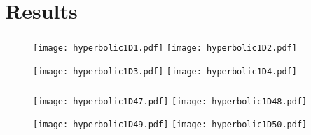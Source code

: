 \section{Results}

\begin{frame}
	\frametitle{\secname}
	\begin{figure}[H]
		\centering
		\texttt{[image: hyperbolic1D1.pdf]}
		\texttt{[image: hyperbolic1D2.pdf]}

		\texttt{[image: hyperbolic1D3.pdf]}
		\texttt{[image: hyperbolic1D4.pdf]}
	\end{figure}
\end{frame}

\begin{frame}
	\frametitle{\secname}
	\begin{figure}[H]
		\centering
		\texttt{[image: hyperbolic1D47.pdf]}
		\texttt{[image: hyperbolic1D48.pdf]}

		\texttt{[image: hyperbolic1D49.pdf]}
		\texttt{[image: hyperbolic1D50.pdf]}
	\end{figure}
\end{frame}
